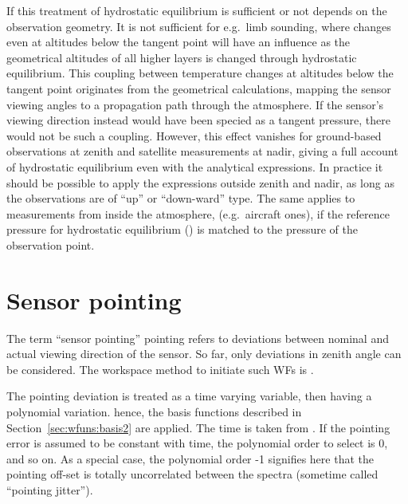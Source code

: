 If this treatment of hydrostatic equilibrium is sufficient or not depends on
the observation geometry. It is not sufficient for e.g.\ limb sounding, where
changes even at altitudes below the tangent point will have an influence as the
geometrical altitudes of all higher layers is changed through hydrostatic
equilibrium. This coupling between temperature changes at altitudes below the
tangent point originates from the geometrical calculations, mapping the sensor
viewing angles to a propagation path through the atmosphere. If the sensor's
viewing direction instead would have been specied as a tangent pressure, there
would not be such a coupling. However, this effect vanishes for ground-based
observations at zenith and satellite measurements at nadir, giving a full
account of hydrostatic equilibrium even with the analytical expressions. In
practice it should be possible to apply the expressions outside zenith and
nadir, as long as the observations are of ``up'' or ``down-ward'' type. The
same applies to measurements from inside the atmosphere, (e.g.\ aircraft ones),
if the reference pressure for hydrostatic equilibrium ()
is matched to the pressure of the observation point.





\section{Sensor pointing}
\label{sec:wfuns:sensorpointing}

The term ``sensor pointing'' pointing refers to deviations between nominal and
actual viewing direction of the sensor. So far, only deviations in zenith angle
can be considered. The workspace method to initiate such WFs is
.

The pointing deviation is treated as a time varying variable, then having a
polynomial variation. hence, the basis functions described in
Section~\ref{sec:wfuns:basis2} are applied. The time is taken from
. If the pointing error is assumed to be constant with
time, the polynomial order to select is 0, and so on. As a special case, the
polynomial order -1 signifies here that the pointing off-set is totally
uncorrelated between the spectra (sometime called ``pointing jitter'').

